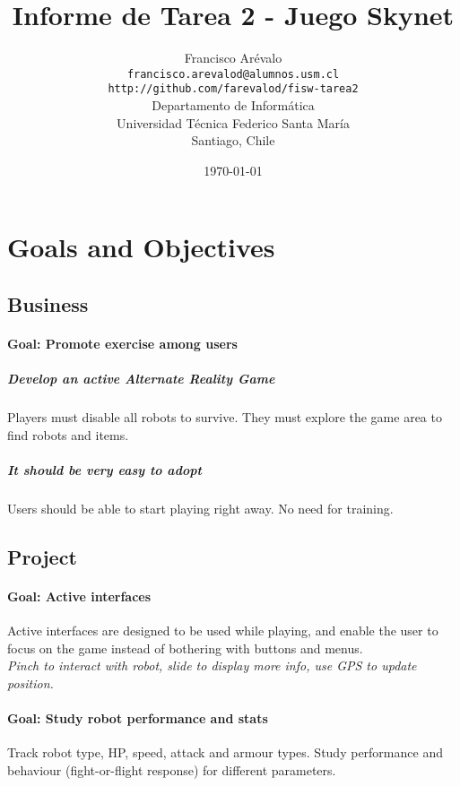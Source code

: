 \documentclass{article}
\begin{document}
\title{Informe de Tarea 2 - Juego Skynet}
\author{Francisco Ar\'evalo\\
  \texttt{francisco.arevalod@alumnos.usm.cl}\\
  \texttt{http://github.com/farevalod/fisw-tarea2}\\
  \vspace{10mm}
  Departamento de Inform\'atica\\
  Universidad T\'ecnica Federico Santa Mar\'ia\\
  Santiago, Chile}
\date{\today}
\maketitle
\tableofcontents
\section{Goals and Objectives}
\subsection{Business}
\paragraph{\textbf{Goal}: Promote exercise among users}
\subparagraph{Develop an active Alternate Reality Game}
Players must disable all robots to survive. They must explore the game area to find robots and items.
\subparagraph{It should be very easy to adopt}
Users should be able to start playing right away. No need for training.
\subsection{Project}
\paragraph{\textbf{Goal}: Active interfaces}
Active interfaces are designed to be used while playing, and enable the user to focus on the game instead of bothering with buttons and menus.\\
\textit{Pinch to interact with robot, slide to display more info, use GPS to update position.}
\paragraph{\textbf{Goal}: Study robot performance and stats}
Track robot type, HP, speed, attack and armour types. Study performance and behaviour (fight-or-flight response) for different parameters.
\end{document}
